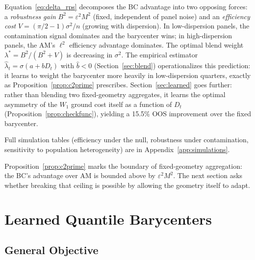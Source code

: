 \begin{remark}
\label{rem:c2prime_blend}
Equation~\eqref{eq:delta_rps} decomposes the BC advantage into two opposing forces: a
\emph{robustness gain} $B^2 = \varepsilon^2 M^2$ (fixed, independent of panel noise) and an
\emph{efficiency cost} $V = (\pi/2-1)\sigma^2/n$ (growing with dispersion).  In
low-dispersion panels, the contamination signal dominates and the barycenter wins; in
high-dispersion panels, the AM's $\ell^2$ efficiency advantage dominates.
The optimal blend weight $\lambda^* = B^2/(B^2 + V)$ is decreasing in $\sigma^2$.
The empirical estimator $\hat{\lambda}_t = \sigma(a + b D_t)$ with $\hat{b} < 0$
(Section~\ref{sec:blend}) operationalizes this prediction: it learns to weight the
barycenter more heavily in low-dispersion quarters, exactly as Proposition~\ref{prop:c2prime}
prescribes.
Section~\ref{sec:learned} goes further: rather than blending two fixed-geometry aggregates,
it learns the optimal asymmetry of the $W_1$ ground cost itself as a function of $D_t$
(Proposition~\ref{prop:checkfunc}), yielding a 15.5\% OOS improvement over the fixed barycenter.
\end{remark}

Full simulation tables (efficiency under the null, robustness under contamination, sensitivity
to population heterogeneity) are in Appendix~\ref{app:simulations}.

Proposition~\ref{prop:c2prime} marks the boundary of fixed-geometry aggregation: the BC's
advantage over AM is bounded above by $\varepsilon^2 M^2$.
The next section asks whether breaking that ceiling is possible by allowing the geometry
itself to adapt.


\section{Learned Quantile Barycenters}
\label{sec:framework}

\subsection{General Objective}

